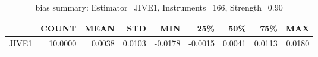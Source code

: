\begin{table}[ht]
\centering
\caption{bias summary: Estimator=JIVE1, Instruments=166, Strength=0.90}
\begin{tabular}{lrrrrrrrr}
\toprule
 & COUNT & MEAN & STD & MIN & 25\% & 50\% & 75\% & MAX \\
\midrule
JIVE1 & 10.0000 & 0.0038 & 0.0103 & -0.0178 & -0.0015 & 0.0041 & 0.0113 & 0.0180 \\
\bottomrule
\end{tabular}
\end{table}
